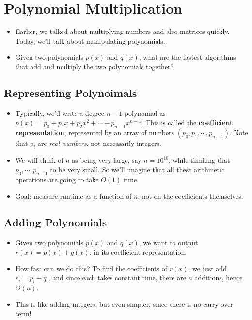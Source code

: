 \section{Polynomial Multiplication}
\begin{itemize}
	\item Earlier, we talked about multiplying numbers and also matrices quickly. Today, we'll talk about manipulating polynomials.
	\item Given two polynomials \( p(x) \) and \( q(x) \), what are the fastest algorithms that add and 
		multiply the two polynomials together?
\end{itemize}
\subsection{Representing Polynoimals}
\begin{itemize}
	\item Typically, we'd write a degree \( n-1 \) polynomial as 
		\( p(x) = p_0 + p_1x + p_2x^2 + \cdots + p_{n-1}x^{n-1} \). This is called
		the \textbf{coefficient representation}, represented by an array of numbers \( (p_0, p_1, \cdots, p_{n-1}) \). 
		Note that \( p_i \) 
		 are \textit{real numbers}, not necessarily integers.  
	 \item We will think of \( n \) as being very large, say \( n = 10^{10} \), while thinking that \( p_0, \cdots, p_{n-1} \)
		 to be very small. So we'll imagine that all these arithmetic operations are going to take \( O(1) \) time.  
	 \item Goal: measure runtime as a function of \( n \), not on the coefficients themselves.    
\end{itemize}
\subsection{Adding Polynomials}
\begin{itemize}
	\item Given two polynomials \( p(x) \) and \( q(x) \), we want to output \( r(x) = p(x) + q(x) \), in its coefficient 
		representation. 
	\item How fast can we do this? To find the coefficients of \( r(x) \), we just add \( r_i = p_i + q_i \), and since each 
		takes constant time, there are \( n \) additions, hence \( O(n) \). 
	\item This is like adding integers, but even simpler, since there is no carry over term!
\end{itemize}
